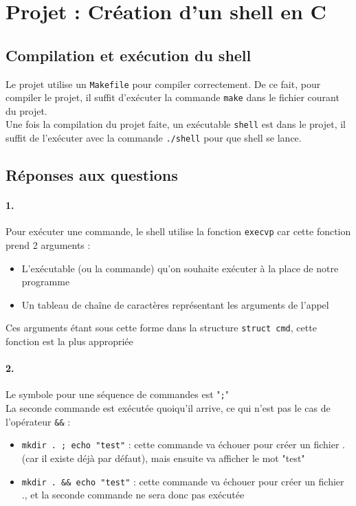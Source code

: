 \documentclass{report}
\title{}
\author{}
\date{\today}
\begin{document}
\section{Projet : Création d'un shell en C}

\subsection{Compilation et exécution du shell}

Le projet utilise un \verb|Makefile| pour compiler correctement. De ce fait, pour compiler le projet, il suffit d'exécuter la commande \verb|make| dans le fichier courant du projet. \\
Une fois la compilation du projet faite, un exécutable \verb|shell| est dans le projet, il suffit de l'exécuter avec la commande \verb|./shell| pour que shell se lance.

\subsection{Réponses aux questions}

\paragraph{1.}
Pour exécuter une commande, le shell utilise la fonction \verb|execvp| car cette fonction prend 2 arguments :
\begin{itemize}
  \item L'exécutable (ou la commande) qu'on souhaite exécuter à la place de notre programme
  \item Un tableau de chaîne de caractères représentant les arguments de l'appel
\end{itemize}
Ces arguments étant sous cette forme dans la structure \verb|struct cmd|, cette fonction est la plus appropriée

\paragraph{2.}
Le symbole pour une séquence de commandes est "\verb|;|" \\
La seconde commande est exécutée quoiqu'il arrive, ce qui n'est pas le cas de l'opérateur \verb|&&| :
\begin{itemize}
  \item \verb|mkdir . ; echo "test"| : cette commande va échouer pour créer un fichier . (car il existe déjà par défaut), mais ensuite va afficher le mot "test"
  \item \verb|mkdir . && echo "test"| : cette commande va échouer pour créer un fichier ., et la seconde commande ne sera donc pas exécutée
\end{itemize}
\end{document}
